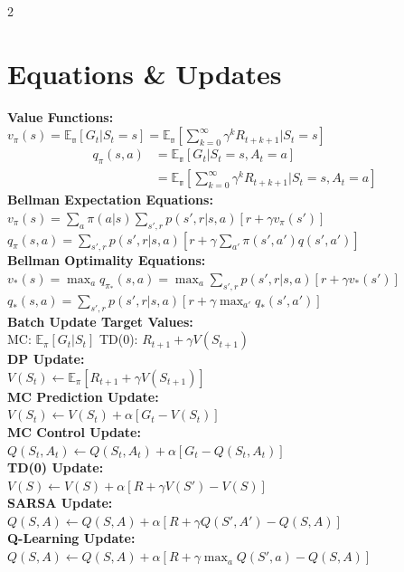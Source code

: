 \documentclass[10pt]{article}
\begin{document}
\begin{multicols*}{2}
	\section*{Equations \& Updates}
	\textbf{Value Functions:} \\
	$v_\pi(s) = \mathbb{E_\pi}[G_t|S_t=s] = \mathbb{E_\pi}[\sum_{k=0}^{\infty}{\gamma^k R_{t+k+1}}|S_t=s]$
	\begin{align*}
		q_\pi(s,a) & = \mathbb{E_\pi}[G_t|S_t=s,A_t=a]                                     \\
		           & = \mathbb{E_\pi}[\sum_{k=0}^{\infty}{\gamma^k R_{t+k+1}}|S_t=s,A_t=a]
	\end{align*}
	\textbf{Bellman Expectation Equations:} \\
	$v_\pi(s) = \sum_a{\pi(a|s)}\sum_{s',r}{p(s',r|s,a)[r + \gamma v_\pi(s')]}$\\[1ex]
	$q_\pi(s,a) = \sum_{s',r}{p(s',r|s,a)[r + \gamma \sum_{a'}{\pi(s',a')q(s',a')}]}$\\[1ex]
	\textbf{Bellman Optimality Equations:} \\
	$v_*(s) = \max_a q_{\pi_*}(s,a) = \max_a \sum_{s',r}{p(s',r|s,a)[r+\gamma v_*(s')]}$ \\[1ex]
	$q_*(s,a) = \sum_{s',r}{p(s',r|s,a)[r+ \gamma \max_{a'}q_*(s',a')]}$ \\[1ex]
	\textbf{Batch Update Target Values:} \\
	MC: $\mathbb{E}_\pi[G_t|S_t]$ \quad TD(0): $R_{t+1} + \gamma V(S_{t+1})$\\[1ex]
	\textbf{DP Update:}\\
	$V(S_t) \leftarrow \mathbb{E}_{\pi}[R_{t+1} + \gamma V(S_{t+1})]$\\[1ex]
	\textbf{MC Prediction Update:}\\
	$V(S_t) \leftarrow V(S_t) + \alpha[G_t  - V(S_t)]$\\[1ex]
	\textbf{MC Control Update:}\\
	$Q(S_t,A_t) \leftarrow Q(S_t,A_t) + \alpha[G_t  - Q(S_t,A_t)]$\\[1ex]
	\textbf{TD(0) Update:}\\
	$V(S) \leftarrow V(S) + \alpha[R + \gamma V(S') - V(S)]$\\[1ex]
	\textbf{SARSA Update:}\\
	$Q(S,A) \leftarrow Q(S,A) + \alpha[R + \gamma Q(S',A') - Q(S,A)]$\\[1ex]
	\textbf{Q-Learning Update:}\\
	$Q(S,A) \leftarrow Q(S,A) + \alpha[R + \gamma \max_a Q(S',a) - Q(S,A)]$\\[1ex]

\end{multicols*}
\end{document}
